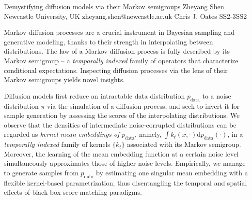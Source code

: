 \begin{talk}
  {Demystifying diffusion models via their Markov semigroups}%
  {Zheyang Shen}%
  {Newcastle University, UK}%
  {zheyang.shen@newcastle.ac.uk}%
  {Chris J. Oates}%
{}{}{SS2-3}{SS2}


Markov diffusion processes are a crucial instrument in Bayesian sampling and generative modeling, thanks to their strength in interpolating between distributions. The law of a Markov diffusion process is fully described by its Markov semigroup -- a \emph{temporally indexed} family of operators that characterize conditional expectations. Inspecting diffusion processes via the lens of their Markov semigroups yields novel insights. 

Diffusion models first reduce an intractable data distribution $p_{\text{data}}$ to a noise distribution $\pi$ via the simulation of a diffusion process, and seek to invert it for sample generation by assessing the scores of the interpolating distributions. We observe that the densities of intermediate noise-corrupted distributions can be regarded as \emph{kernel mean embeddings of $p_{\text{data}}$}, namely, $\int k_t(x, \cdot)\mathrm{d}p_{\text{data}}(\cdot)$, in a \emph{temporally indexed} family of kernels $\{k_t\}$ associated with its Markov semigroup. Moreover, the learning of the mean embedding function at a certain noise level simultaneously approximates those of higher noise levels. Empirically, we manage to generate samples from $p_{\text{data}}$ by estimating one singular mean embedding with a flexible kernel-based parametrization, thus disentangling the temporal and spatial effects of black-box score matching paradigms. 

\medskip

\end{talk}

